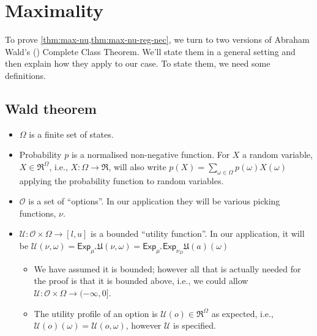 \documentclass[a4paper]{article}
\newcommand\D{\mathcal{D}}
\newcommand\Exp{\mathsf{Exp}}
\newcommand\EU{\mathrm{EU}}
\renewcommand\O{\mathcal{O}}
\newcommand\U{\mathfrak{U}} %
\newcommand\Uwald{\mathcal{U}} %
\newcommand\SetDelimiter[1][]{
	\nonscript\,#1\vert \allowbreak \nonscript\,\mathopen{}}
\providecommand\given{\SetDelimiter}
\renewcommand{\leq}{\leqslant}
\newenvironment{CCM rewritten}
{\begingroup\color{blue}} %
{\endgroup}              %
\begin{document}

\section{Maximality}
To prove \cref{thm:max-nu,thm:max-nu-reg-nec}, we turn to two versions of Abraham Wald's (\citeyear{wald1947cct}) Complete Class Theorem. We'll state them in a general setting and then explain how they apply to our case. To state them, we need some definitions.
\subsection{Wald theorem}


\begin{itemize}
	\item $\Omega$ is a finite set of states.
	\item Probability $p$ is a normalised non-negative function. For $X$ a random variable, $X\in\Re^\Omega$, i.e., $X:\Omega\to\Re$, will also write $p(X)=\sum_{\omega\in\Omega}p(\omega)X(\omega)$ applying the probability function to random variables. 
	\item $\O$ is a set of ``options''. In our application they will be various picking functions, $\nu$.
	\item $\Uwald:\O\times\Omega\to [l,u]$ is a bounded ``utility function''. In our application, it will be $\Uwald(\nu,\omega)=\Exp_{\mu^*}\U(\nu,\omega)=\Exp_{\mu^*}\Exp_{\nu_D}\U(a)(\omega)$ \begin{itemize}
		\item We have assumed it is bounded; however all that is actually needed for the proof is that it is bounded above, i.e., we could allow $\Uwald:\O\times\Omega\to (-\infty,0]$. 
		\item The utility profile of an option is $\Uwald(o)\in\Re^\Omega$ as expected, i.e., $\Uwald(o)(\omega)=\Uwald(o,\omega)$, however $\Uwald$ is specified. 
	\end{itemize}
\end{itemize}
\end{document}
